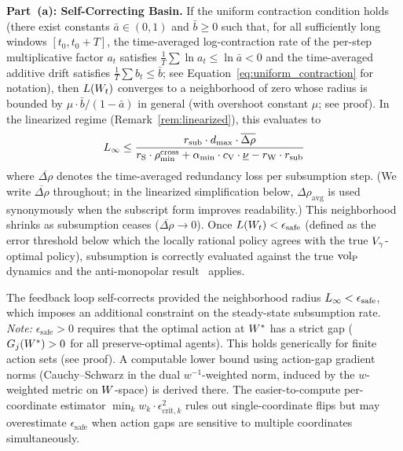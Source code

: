 \begin{theorem}
\medskip
\noindent\textbf{Part~(a): Self-Correcting Basin.}
If the uniform contraction condition holds (there exist constants
$\bar{a} \in (0,1)$ and $\bar{b} \geq 0$ such that, for all
sufficiently long windows $[t_0, t_0+T]$, the time-averaged
log-contraction rate of the per-step multiplicative factor
$a_t$ satisfies $\frac{1}{T}\sum \ln a_t \leq \ln \bar{a} < 0$ and
the time-averaged additive drift satisfies
$\frac{1}{T}\sum b_t \leq \bar{b}$; see Equation~\ref{eq:uniform_contraction}
for notation), then $L(W_t)$ converges to a neighborhood of zero
whose radius is bounded by $\mu \cdot \bar{b}/(1 - \bar{a})$ in
general (with overshoot constant $\mu$; see proof).  In the
linearized regime (Remark~\ref{rem:linearized}), this evaluates to
\begin{equation}
\label{eq:neighborhood}
L_\infty \leq \frac{r_{\mathrm{sub}} \cdot d_{\mathrm{max}} \cdot
  \overline{\Delta\rho}}{r_{\mathrm{S}} \cdot \rho_{\min}^{\mathrm{cross}}
  + \alpha_{\min} \cdot c_{\mathrm{V}} \cdot \underline{\nu} - r_{\mathrm{W}} \cdot r_{\mathrm{sub}}}
\end{equation}
where $\overline{\Delta\rho}$ denotes the time-averaged redundancy
loss per subsumption step.  (We write $\overline{\Delta\rho}$
throughout; in the linearized simplification below,
$\Delta\rho_{\mathrm{avg}}$ is used synonymously when the subscript
form improves readability.)  This neighborhood shrinks as subsumption ceases
($\overline{\Delta\rho} \to 0$).  Once $L(W_t) <
\epsilon_{\mathrm{safe}}$ (defined as the error threshold below which
the locally rational policy agrees with the true $V_\gamma$-optimal
policy), subsumption is correctly evaluated against the true ${\operatorname{vol}_{\mathrm{P}}}$
dynamics and the anti-monopolar result~\citep[Proposition~6]{lasser2026horizon} applies.

The feedback loop self-corrects provided the neighborhood radius
$L_\infty < \epsilon_{\mathrm{safe}}$, which imposes an additional
constraint on the steady-state subsumption rate.  \emph{Note:}
$\epsilon_{\mathrm{safe}} > 0$ requires that the optimal action at
$W^*$ has a strict gap ($G_j(W^*) > 0$ for all preserve-optimal
agents).  This holds generically for finite action sets (see proof).
A computable lower bound using action-gap gradient norms
(Cauchy--Schwarz in the dual $w^{-1}$-weighted norm, induced by the
$w$-weighted metric on $W$-space) is derived there.  The
easier-to-compute per-coordinate estimator $\min_k w_k \cdot
\epsilon_{\mathrm{crit},k}^2$ rules out single-coordinate flips but
may overestimate $\epsilon_{\mathrm{safe}}$ when action gaps are
sensitive to multiple coordinates simultaneously.


\end{theorem}
